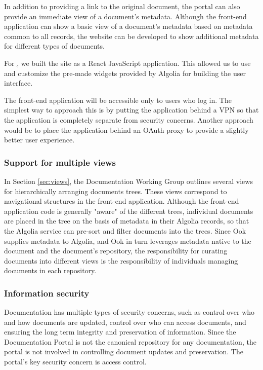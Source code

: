 In addition to providing a link to the original document, the portal can also provide an immediate view of a document's metadata.
Although the front-end application can show a basic view of a document's metadata based on metadata common to all records, the website can be developed to show additional metadata for different types of documents.

For \href{www.lsst.io}, we built the site as a React JavaScript application.
This allowed us to use and customize the pre-made widgets provided by Algolia for building the user interface.

The front-end application will be accessible only to users who log in.
The simplest way to approach this is by putting the application behind a VPN so that the application is completely separate from security concerns.
Another approach would be to place the application behind an OAuth proxy to provide a slightly better user experience.

\subsubsection{Support for multiple views}

In Section \ref{sec:views}, the Documentation Working Group outlines several views for hierarchically arranging documents trees.
These views correspond to navigational structures in the front-end application.
Although the front-end application code is generally "aware" of the different trees, individual documents are placed in the tree on the basis of metadata in their Algolia records, so that the Algolia service can pre-sort and filter documents into the trees.
Since Ook supplies metadata to Algolia, and Ook in turn leverages metadata native to the document and the document's repository, the responsibility for curating documents into different views is the responsibility of individuals managing documents in each repository.

\subsubsection{Information security}

Documentation has multiple types of security concerns, such as control over who and how documents are updated, control over who can access documents, and ensuring the long term integrity and preservation of information.
Since the Documentation Portal is not the canonical repository for any documentation, the portal is not involved in controlling document updates and preservation.
The portal's key security concern is access control.

